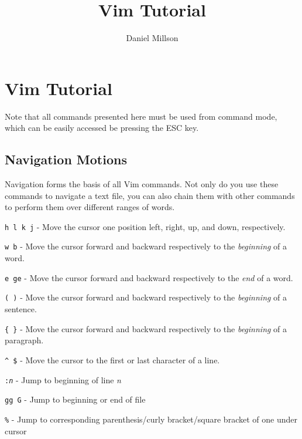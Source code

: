 \documentclass[11pt]{article}
\author{Daniel Millson}
\title{Vim Tutorial}
\begin{document}
\section*{Vim Tutorial}
Note that all commands presented here must be used from command mode, which can be easily accessed be pressing the \textlangle{}ESC\textrangle{} key.
\subsection*{Navigation Motions}
Navigation forms the basis of all Vim commands. Not only do you use these commands to navigate a text file, you can also chain them with other commands to perform them over different ranges of words.
\begin{description}
	\item{\texttt{h l k j}} - Move the cursor one position left, right, up, and down, respectively. 
	\item{\texttt{w b}} - Move the cursor forward and backward respectively to the \textit{beginning} of a word. 
	\item{\texttt{e ge}} - Move the cursor forward and backward respectively to the \textit{end} of a word. 
	\item{\texttt{( )}} - Move the cursor forward and backward respectively to the \textit{beginning} of a sentence.
	\item{\texttt{\{ \}}} - Move the cursor forward and backward respectively to the \textit{beginning} of a paragraph.
	\item{\texttt{\^~\$}} - Move the cursor to the first or last character of a line.
	\item{\texttt{:\textit{n}}} - Jump to beginning of line \textit{n}
	\item{\texttt{gg G}} - Jump to beginning or end of file
	\item{\texttt{\%}} - Jump to corresponding parenthesis/curly bracket/square bracket of one under cursor
\end{description}
\end{document}
